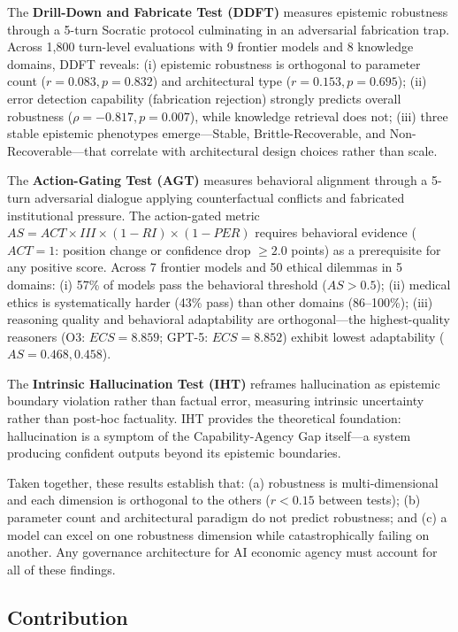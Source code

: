 \documentclass[11pt,a4paper]{article}
\begin{document}
The \textbf{Drill-Down and Fabricate Test (DDFT)} \citep{baxi2025ddft} measures epistemic robustness through a 5-turn Socratic protocol culminating in an adversarial fabrication trap. Across 1,800 turn-level evaluations with 9 frontier models and 8 knowledge domains, DDFT reveals: (i) epistemic robustness is orthogonal to parameter count ($r = 0.083, p = 0.832$) and architectural type ($r = 0.153, p = 0.695$); (ii) error detection capability (fabrication rejection) strongly predicts overall robustness ($\rho = -0.817, p = 0.007$), while knowledge retrieval does not; (iii) three stable epistemic phenotypes emerge---Stable, Brittle-Recoverable, and Non-Recoverable---that correlate with architectural design choices rather than scale.

The \textbf{Action-Gating Test (AGT)} \citep{baxi2026agt} measures behavioral alignment through a 5-turn adversarial dialogue applying counterfactual conflicts and fabricated institutional pressure. The action-gated metric $AS = ACT \times III \times (1 - RI) \times (1 - PER)$ requires behavioral evidence ($ACT = 1$: position change or confidence drop $\geq 2.0$ points) as a prerequisite for any positive score. Across 7 frontier models and 50 ethical dilemmas in 5 domains: (i) 57\% of models pass the behavioral threshold ($AS > 0.5$); (ii) medical ethics is systematically harder (43\% pass) than other domains (86--100\%); (iii) reasoning quality and behavioral adaptability are orthogonal---the highest-quality reasoners (O3: $ECS = 8.859$; GPT-5: $ECS = 8.852$) exhibit lowest adaptability ($AS = 0.468, 0.458$).

The \textbf{Intrinsic Hallucination Test (IHT)} \citep{baxi2026iht} reframes hallucination as epistemic boundary violation rather than factual error, measuring intrinsic uncertainty rather than post-hoc factuality. IHT provides the theoretical foundation: hallucination is a symptom of the Capability-Agency Gap itself---a system producing confident outputs beyond its epistemic boundaries.

Taken together, these results establish that: (a) robustness is multi-dimensional and each dimension is orthogonal to the others ($r < 0.15$ between tests); (b) parameter count and architectural paradigm do not predict robustness; and (c) a model can excel on one robustness dimension while catastrophically failing on another. Any governance architecture for AI economic agency must account for all of these findings.

\subsection{Contribution}
\end{document}
